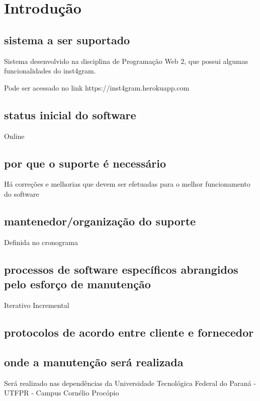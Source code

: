 \chapter{Introdução} 

\section{sistema a ser suportado}

Sistema desenvolvido na disciplina de Programação Web 2, 
que possui algumas funcionalidades do inst4gram.

Pode ser acessado no link https://inst4gram.herokuapp.com

\section{status inicial do software} 
Online
\section{por que o suporte é necessário} 
Há correções e melhorias que devem ser efetuadas para o melhor funcionamento do software
\section{mantenedor/organização do suporte} 
Definida no cronograma
\section{processos de software específicos abrangidos pelo esforço de manutenção} 

Iterativo Incremental

\section{protocolos de acordo entre cliente e fornecedor}

\section{onde a manutenção será realizada}
Será realizado nas dependências da Universidade Tecnológica Federal do Paraná - UTFPR - Campus Cornélio Procópio
